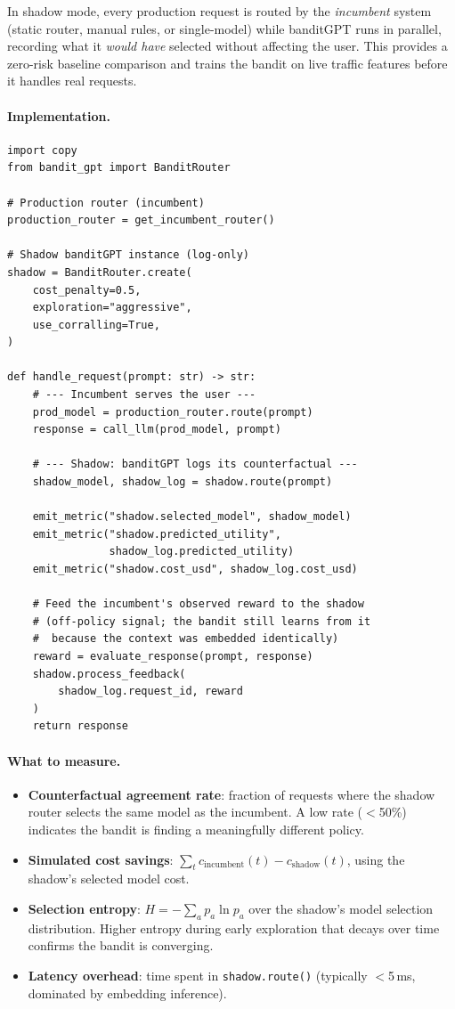 In shadow mode, every production request is routed by the \emph{incumbent} system (static router, manual rules, or single-model) while banditGPT runs in parallel, recording what it \emph{would have} selected without affecting the user.
This provides a zero-risk baseline comparison and trains the bandit on live traffic features before it handles real requests.

\paragraph{Implementation.}

{\small\begin{verbatim}
import copy
from bandit_gpt import BanditRouter

# Production router (incumbent)
production_router = get_incumbent_router()

# Shadow banditGPT instance (log-only)
shadow = BanditRouter.create(
    cost_penalty=0.5,
    exploration="aggressive",
    use_corralling=True,
)

def handle_request(prompt: str) -> str:
    # --- Incumbent serves the user ---
    prod_model = production_router.route(prompt)
    response = call_llm(prod_model, prompt)

    # --- Shadow: banditGPT logs its counterfactual ---
    shadow_model, shadow_log = shadow.route(prompt)

    emit_metric("shadow.selected_model", shadow_model)
    emit_metric("shadow.predicted_utility",
                shadow_log.predicted_utility)
    emit_metric("shadow.cost_usd", shadow_log.cost_usd)

    # Feed the incumbent's observed reward to the shadow
    # (off-policy signal; the bandit still learns from it
    #  because the context was embedded identically)
    reward = evaluate_response(prompt, response)
    shadow.process_feedback(
        shadow_log.request_id, reward
    )
    return response
\end{verbatim}}

\paragraph{What to measure.}
\begin{itemize}[nosep,leftmargin=*]
    \item \textbf{Counterfactual agreement rate}: fraction of requests where the shadow router selects the same model as the incumbent.  A low rate ($<$50\%) indicates the bandit is finding a meaningfully different policy.
    \item \textbf{Simulated cost savings}: $\sum_t c_{\mathrm{incumbent}}(t) - c_{\mathrm{shadow}}(t)$, using the shadow's selected model cost.
    \item \textbf{Selection entropy}: $H = -\sum_a p_a \ln p_a$ over the shadow's model selection distribution.  Higher entropy during early exploration that decays over time confirms the bandit is converging.
    \item \textbf{Latency overhead}: time spent in \texttt{shadow.route()} (typically $<$5\,ms, dominated by embedding inference).
\end{itemize}

